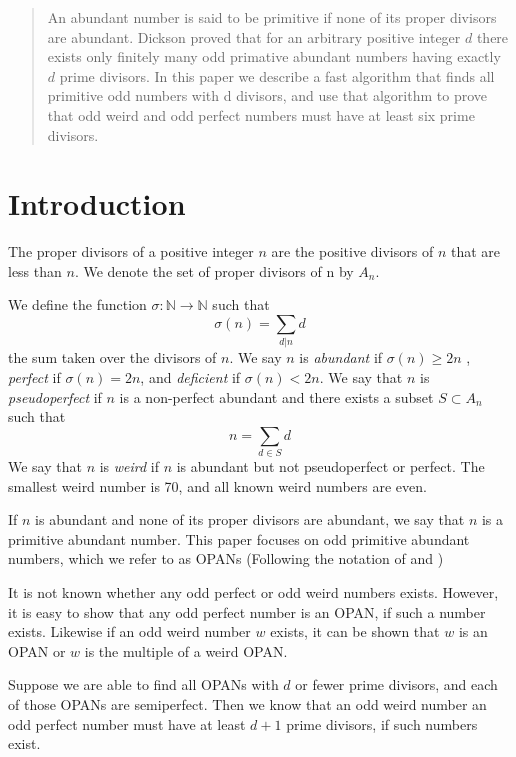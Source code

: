 \documentclass[../paper.tex]{article}
\begin{document}
\begin{abstract}
An abundant number is said to be primitive if none of its proper 
divisors are abundant.  Dickson proved that for an arbitrary
positive integer $d$ there exists only finitely many odd primative
abundant numbers having exactly $d$ prime divisors\cite{dickson}.
In this paper we describe a fast algorithm
that finds all primitive odd numbers with d divisors, and use that
algorithm to prove that odd weird and odd perfect numbers must
have at least six prime divisors.
\end{abstract}

\section{Introduction}
The proper divisors of a positive integer $n$ are the positive
divisors of $n$ that are less than $n$. We denote the set of 
proper divisors of n by $\textit{A}_{n}$.

We define the function 
%
$\sigma: \mathbb{N} \rightarrow \mathbb{N}$
%
such that
%
$$\sigma(n) = \sum_{d|n}d$$
%
the sum taken over the divisors of $n$. We say $n$ is 
\textit{abundant} if $\sigma(n) \geq 2n$ \footnotemark
, \textit{perfect} if $\sigma(n) = 2n$, and \textit{deficient} if 
$\sigma(n) < 2n$. We say that $n$ is \textit{pseudoperfect} if 
$n$ is a non-perfect abundant and there exists a subset $ S 
\subset \textit{A}_{n}$ such that
%
%
%
$$ n = \sum_{d \in S} d$$
%
We say that $n$ is \textit{weird} if $n$ is abundant but not 
pseudoperfect or perfect. The smallest weird number is 70, and 
all known weird numbers are even.

If $n$ is abundant and none of its proper divisors are abundant,
we say that $n$ is a primitive abundant number. This paper focuses
on odd primitive abundant numbers, which we refer to as OPANs
(Following the notation of \cite{valdas} and \cite{amato})

It is not known whether any odd perfect or odd weird numbers
exists. However, it is easy to show that any odd perfect number is
an OPAN, if such a number exists. Likewise if an odd weird number
$w$ exists, it can be shown that $w$ is an OPAN or $w$ is the
multiple of a weird OPAN.

Suppose we are able to find all OPANs with $d$ or fewer prime divisors, 
and each of those OPANs are semiperfect. Then we know that an odd 
weird number an odd perfect number must have at least $d + 1$ prime 
divisors, if such numbers exist.
\end{document}
